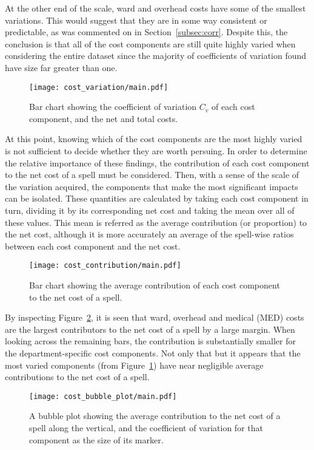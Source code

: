 At the other end of the scale, ward and overhead costs have some of the smallest
variations. This would suggest that they are in some way consistent or
predictable, as was commented on in Section~\ref{subsec:corr}. Despite this, the
conclusion is that all of the cost components are still quite highly varied when
considering the entire dataset since the majority of coefficients of variation
found have size far greater than one. 

\begin{figure}[h]
    \centering
    \texttt{[image: cost\_variation/main.pdf]}
    \caption{Bar chart showing the coefficient of variation \(C_{v}\) of each
        cost component, and the net and total costs.}\label{fig:cost_variation}
\end{figure}

At this point, knowing which of the cost components are the most highly varied
is not sufficient to decide whether they are worth persuing. In order to
determine the relative importance of these findings, the contribution of each
cost component to the net cost of a spell must be considered. Then, with a sense
of the scale of the variation acquired, the components that make the most
significant impacts can be isolated. These quantities are calculated by taking
each cost component in turn, dividing it by its corresponding net cost and
taking the mean over all of these values. This mean is referred as the average
contribution (or proportion) to the net cost, although it is more accurately an
average of the spell-wise ratios between each cost component and the net cost.

\begin{figure}[h]
    \centering
    \texttt{[image: cost\_contribution/main.pdf]}
    \caption{Bar chart showing the average contribution of each cost component
        to the net cost of a spell.}\label{fig:cost_contribution}
\end{figure}

By inspecting Figure~\ref{fig:cost_contribution}, it is seen that ward, overhead
and medical (MED) costs are the largest contributors to the net cost of a spell
by a large margin. When looking across the remaining bars, the contribution is
substantially smaller for the department-specific cost components. Not only that
but it appears that the most varied components (from
Figure~\ref{fig:cost_variation}) have near negligible average contributions to
the net cost of a spell.

\begin{figure}[h]
    \hspace{-75pt}
    \texttt{[image: cost\_bubble\_plot/main.pdf]}\hfill%
    \caption{A bubble plot showing the average contribution to the net cost of a
    spell along the vertical, and the coefficient of variation for that
    component as the size of its marker.}\label{fig:cost_bubble_plot}
\end{figure}

